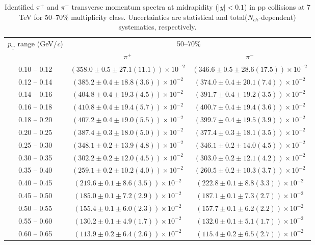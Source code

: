 \begin{table}
\caption{Identified $\pi^{+}$ and $\pi^{-}$  transverse momentum spectra at midrapidity ($|y|<0.1$) in pp collisions at 7 TeV for 50--70\% multiplicity class. Uncertainties are statistical and total($N_{ch}$-dependent) systematics, respectively.}
\label{tab:PionPlus_PionMinus_50to70}
\begin{center}
\begin{tabular}{ c | c c }
\hline
\multirow{2}{*}{$p_{\mathrm{T}}$ range (GeV/\textit{c})} & \multicolumn{2}{c}{50--70\%} \\ & $\pi^{+}$& $\pi^{-}$\\ 
\hline
0.10 -- 0.12 & $(358.0\pm0.5\pm27.1(11.1))\times10^{-2}$ & $(346.6\pm0.5\pm28.6(17.5))\times10^{-2}$ \\ 
0.12 -- 0.14 & $(385.2\pm0.4\pm18.8(3.6))\times10^{-2}$ & $(374.0\pm0.4\pm20.1(7.4))\times10^{-2}$ \\ 
0.14 -- 0.16 & $(404.8\pm0.4\pm19.3(4.5))\times10^{-2}$ & $(391.7\pm0.4\pm19.2(3.5))\times10^{-2}$ \\ 
0.16 -- 0.18 & $(410.8\pm0.4\pm19.4(5.7))\times10^{-2}$ & $(400.7\pm0.4\pm19.4(3.6))\times10^{-2}$ \\ 
0.18 -- 0.20 & $(407.2\pm0.4\pm19.0(5.5))\times10^{-2}$ & $(399.7\pm0.4\pm19.5(3.9))\times10^{-2}$ \\ 
0.20 -- 0.25 & $(387.4\pm0.3\pm18.0(5.0))\times10^{-2}$ & $(377.4\pm0.3\pm18.1(3.5))\times10^{-2}$ \\ 
0.25 -- 0.30 & $(348.1\pm0.2\pm13.9(4.8))\times10^{-2}$ & $(346.1\pm0.2\pm14.0(4.5))\times10^{-2}$ \\ 
0.30 -- 0.35 & $(302.2\pm0.2\pm12.0(4.5))\times10^{-2}$ & $(303.0\pm0.2\pm12.1(4.2))\times10^{-2}$ \\ 
0.35 -- 0.40 & $(259.1\pm0.2\pm10.2(4.0))\times10^{-2}$ & $(260.5\pm0.2\pm10.3(3.7))\times10^{-2}$ \\ 
0.40 -- 0.45 & $(219.6\pm0.1\pm8.6(3.5))\times10^{-2}$ & $(222.8\pm0.1\pm8.8(3.3))\times10^{-2}$ \\ 
0.45 -- 0.50 & $(185.0\pm0.1\pm7.2(2.9))\times10^{-2}$ & $(187.1\pm0.1\pm7.3(2.7))\times10^{-2}$ \\ 
0.50 -- 0.55 & $(155.4\pm0.1\pm6.0(2.3))\times10^{-2}$ & $(157.7\pm0.1\pm6.2(2.2))\times10^{-2}$ \\ 
0.55 -- 0.60 & $(130.2\pm0.1\pm4.9(1.7))\times10^{-2}$ & $(132.0\pm0.1\pm5.1(1.7))\times10^{-2}$ \\ 
0.60 -- 0.65 & $(113.9\pm0.2\pm6.4(2.6))\times10^{-2}$ & $(115.4\pm0.2\pm6.5(2.7))\times10^{-2}$ \\ 

\end{tabular}
\end{center}
\end{table}
